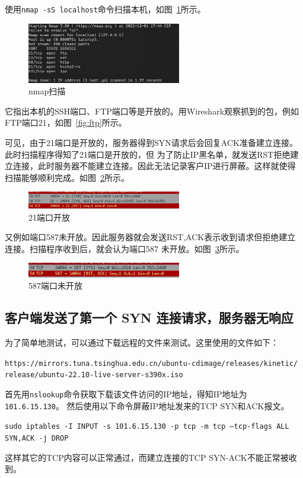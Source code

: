 \documentclass[a4paper,twoside]{article}
\begin{document}
\begin{spacing}{1.2}
使用\texttt{nmap -sS localhost}命令扫描本机，如图~\ref{fig:nmap}所示。
\begin{figure}[htb]
	\centering
	\caption{nmap扫描}
	\label{fig:nmap}
	\includegraphics[width=0.6\textwidth]{nmap.png}
\end{figure}
它指出本机的SSH端口、FTP端口等是开放的。用Wireshark观察抓到的包，例如FTP端口21，如图~\ref{fig:ftp}所示。

可见，由于21端口是开放的，服务器得到SYN请求后会回复ACK准备建立连接。此时扫描程序得知了21端口是开放的，但
为了防止IP黑名单，就发送RST拒绝建立连接，此时服务器不能建立连接。因此无法记录客户IP进行屏蔽。这样就使得
扫描能够顺利完成。如图~\ref{fig:exist}所示。
\begin{figure}[htb]
	\centering
	\caption{21端口开放}
	\label{fig:exist}
	\includegraphics[width=0.6\textwidth]{exist.png}
\end{figure}
又例如端口587未开放。因此服务器就会发送RST,ACK表示收到请求但拒绝建立连接。扫描程序收到后，就会认为端口587
未开放。如图~\ref{fig:nexist}所示。
\begin{figure}[htb]
	\centering
	\caption{587端口未开放}
	\label{fig:nexist}
	\includegraphics[width=0.6\textwidth]{nexist.png}
\end{figure}

\subsection{客户端发送了第一个 SYN 连接请求，服务器无响应}
\label{sec:client-syn}
为了简单地测试，可以通过下载远程的文件来测试。这里使用的文件如下：
\begin{center}
\texttt{https://mirrors.tuna.tsinghua.edu.cn/ubuntu-cdimage/releases/kinetic/\\ release/ubuntu-22.10-live-server-s390x.iso}
\end{center}
首先用\texttt{nslookup}命令获取下载该文件访问的IP地址，得知IP地址为\texttt{101.6.15.130}。
然后使用以下命令屏蔽IP地址发来的TCP SYN和ACK报文。
\begin{center}
\texttt{sudo iptables -I INPUT -s 101.6.15.130 -p tcp -m tcp --tcp-flags ALL SYN,ACK -j DROP}
\end{center}
这样其它的TCP内容可以正常通过，而建立连接的TCP SYN-ACK不能正常被收到。


\end{spacing}
\end{document}
